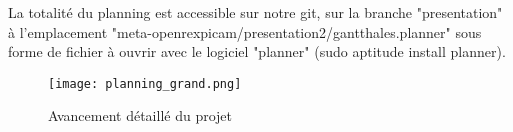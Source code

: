   La totalité du planning est accessible sur notre git, sur la branche "presentation"
  à l'emplacement "meta-openrexpicam/presentation2/gantthales.planner" sous forme
  de fichier à ouvrir avec le logiciel "planner" (sudo aptitude install planner).

\clearpage
\begin{landscape}
\begin{figure}[th]
    \centering
    \texttt{[image: planning\_grand.png]}
    \decoRule
    \caption{Avancement détaillé du projet}
    \label{fig:planning}
\end{figure}
\end{landscape}


